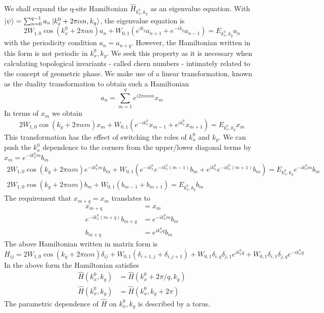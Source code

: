 We shall expand the q-site Hamiltonian $\hat{H}_{k_x^0, k_y}$ as an eigenvalue equation. With $\ket{\psi} = \sum_{n=0}^{q-1}{a_n \ket{k_{x}^0 + 2\pi\alpha n, k_y}}$, the 
eigenvalue equation is
\begin{equation}
2W_{1,0} \cos(k_{x}^0 + 2\pi\alpha n) a_{n} + W_{0,1} (e^{ik_y} a_{n+1} + e^{-ik_y} a_{n-1}) = E_{k_{x}^0, k_y} a_n
\end{equation} with the periodicity condition $a_{n} = a_{n+q}$.
However, the Hamiltonian written in this form is not periodic in $k_x^0 , k_y$. We seek this property as it is necessary when calculating topological invariants - called
chern numbers - intimately related to the concept of geometric phase. We make use of a linear transformation, known as the duality transformation \cite{aubry1980analyticity} to obtain such a Hamiltonian
\begin{equation}
 a_{n} = \sum_{m=1}^{q} e^{i2\pi\alpha mn} x_{m}
\end{equation} In terms of $x_{m}$ we obtain
\begin{equation}
 2W_{1,0} \cos(k_y + 2\pi\alpha m)x_{m} + W_{0,1}(e^{-ik_{x}^0} x_{m-1} + e^{ik_{x}^0}x_{m+1}) = E_{k_{x}^0, k_y} x_{m}
\end{equation} This transformation has the effect of switching the roles of $k_{x}^0$ and $k_{y}$.
We can push the $k_{x}^0$ dependence to the corners from the upper/lower diagonal terms by $x_m = e^{-ik_{x}^0 m} b_{m}$
\begin{gather}
 2W_{1,0} \cos(k_y + 2\pi\alpha m)e^{-ik_{x}^0 m} b_{m} + W_{0,1}(e^{-ik_{x}^0} e^{-ik_{x}^0 (m-1)} b_{m} + e^{ik_{x}^0}e^{-ik_{x}^0 (m+1)} b_{m}) = E_{k_{x}^0, k_y} e^{-ik_{x}^0 m} b_{m} \nonumber \\
 2W_{1,0} \cos(k_y + 2\pi\alpha m)b_{m} + W_{0,1}(b_{m-1} + b_{m+1}) = E_{k_{x}^0, k_y} b_{m}
\end{gather}
The requirement that $x_{m+q} = x_{m}$ translates to
\begin{align}
 x_{m+q} &= x_{m} \nonumber \\
 e^{-ik_{x}^0 (m+q)} b_{m+q} &= e^{-ik_{x}^0 m} b_{m} \nonumber \\
 b_{m+q} &= e^{ik_{x}^0 q} b_{m}
\end{align}
The above Hamiltonian written in matrix form is
\begin{equation}
H_{ij} = 2W_{1,0} \cos(k_y + 2\pi\alpha m) \delta_{ij} + W_{0,1} (\delta_{i+1, j} + \delta_{i, j+1}) + W_{0,1}\delta_{i,q}\delta_{j,1} e^{ik_{x}^0 q} + W_{0,1}\delta_{i,1}\delta_{j,q} e^{-ik_{x}^0 q}
\end{equation}
In the above form the Hamiltonian satisfies
\begin{align}
 \hat{H}(k_{x}^0, k_y) &= \hat{H}(k_{x}^0 + 2\pi/q, k_y) \\
 \hat{H}(k_{x}^0, k_y) &= \hat{H}(k_{x}^0, k_y+2\pi)
\end{align} The parametric dependence of $\hat{H}$ on $k_x^0 , k_y$ is described by a torus.

